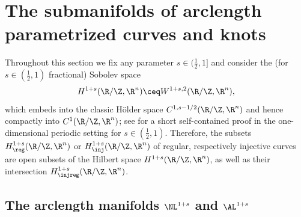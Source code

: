  
\section{The submanifolds of arclength parametrized curves and knots}\label{sec:arclength}
Throughout this section we fix any parameter $s\in (\frac{1}{2},1]$ and
consider the (for $s\in (\frac{1}{2},1)$ fractional) Sobolev space 
\begin{equation}\label{eq:frac-space}
H^{1+s}(\R/\Z,\R^n) \ceq W^{1+s,2}(\R/\Z,\R^n),
\end{equation}
which embeds into the classic H\"older space
$C^{1,s-1/2}(\R/\Z,\R^n)$ and 
hence compactly into $C^1(\R/\Z,\R^n)$; 
see \cite[Theorem A.2]{knappmann-etal_2023}
for a short self-contained proof in the one-dimensional periodic setting
for $s\in (\frac{1}{2},1).$
Therefore, 
the subsets $H^{1+s}_\reg(\R/\Z,\R^n)$ or $H^{1+s}_\inj(\R/\Z,\R^n)$ 
of regular, respectively injective
curves are open subsets of the Hilbert space
$H^{1+s}(\R/\Z,\R^n)$, as well as their
intersection $H^{1+s}_\injreg(\R/\Z,\R^n)$.

\subsection{The arclength manifolds \texorpdfstring{$\NL^{1+s}$}{N1+s} and \texorpdfstring{$\AL^{1+s}$}{A1+s}}
\label{sec:AL}

